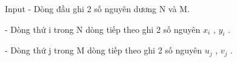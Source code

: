 Input  
- Dòng đầu ghi 2 số nguyên dương N và M.  

   - Dòng thứ i trong N dòng tiếp theo ghi 2 số nguyên $x_{i}$   , $y_{i}$   .  

   - Dòng thứ j trong M dòng tiếp theo ghi 2 số nguyên $u_{j}$   , $v_{j}$   .